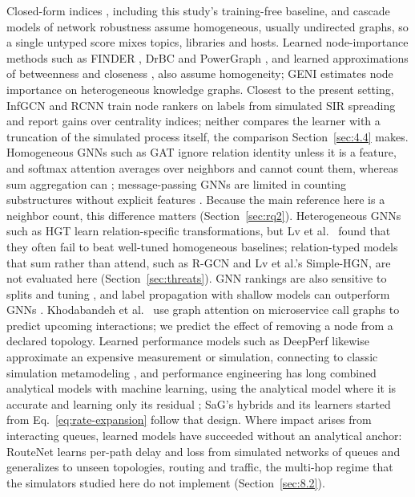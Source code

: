 \documentclass[preprint,3p]{elsarticle}
\begin{document}
Closed-form indices \cite{freeman1977centrality,brandes2001faster,brin1998pagerank,newman2010networks}, including this study's training-free baseline, and cascade models of network robustness \cite{albert2000error,motter2002cascade,buldyrev2010cascade} assume homogeneous, usually undirected graphs, so a single untyped score mixes topics, libraries and hosts. Learned node-importance methods such as FINDER \cite{fan2020keyplayers}, DrBC \cite{fan2019learning} and PowerGraph \cite{varbella2024powergraph}, and learned approximations of betweenness and closeness \cite{maurya2021gnnbet}, also assume homogeneity; GENI \cite{park2019geni} estimates node importance on heterogeneous knowledge graphs. Closest to the present setting, InfGCN \cite{zhao2020infgcn} and RCNN \cite{yu2020rcnn} train node rankers on labels from simulated SIR spreading and report gains over centrality indices; neither compares the learner with a truncation of the simulated process itself, the comparison Section~\ref{sec:4.4} makes. Homogeneous GNNs such as GAT \cite{velickovic2018graph} ignore relation identity unless it is a feature, and softmax attention averages over neighbors and cannot count them, whereas sum aggregation can \cite{xu2019gin,corso2020pna}; message-passing GNNs are limited in counting substructures without explicit features \cite{chen2020can}. Because the main reference here is a neighbor count, this difference matters (Section~\ref{sec:rq2}). Heterogeneous GNNs such as HGT \cite{hu2020hgt} learn relation-specific transformations, but Lv et al.~\cite{lv2021revisiting} found that they often fail to beat well-tuned homogeneous baselines; relation-typed models that sum rather than attend, such as R-GCN \cite{schlichtkrull2018rgcn} and Lv et al.'s Simple-HGN, are not evaluated here (Section~\ref{sec:threats}). GNN rankings are also sensitive to splits and tuning \cite{shchur2018pitfalls}, and label propagation with shallow models can outperform GNNs \cite{huang2021combining}. Khodabandeh et al.~\cite{khodabandeh2025linkpred} use graph attention on microservice call graphs to predict upcoming interactions; we predict the effect of removing a node from a declared topology. Learned performance models such as DeepPerf \cite{ha2019deepperf} likewise approximate an expensive measurement or simulation, connecting to classic simulation metamodeling \cite{kleijnen2015design}, and performance engineering has long combined analytical models with machine learning, using the analytical model where it is accurate and learning only its residual \cite{didona2015enhancing}; SaG's hybrids and its learners started from Eq.~\eqref{eq:rate-expansion} follow that design. Where impact arises from interacting queues, learned models have succeeded without an analytical anchor: RouteNet \cite{rusek2020routenet} learns per-path delay and loss from simulated networks of queues and generalizes to unseen topologies, routing and traffic, the multi-hop regime that the simulators studied here do not implement (Section~\ref{sec:8.2}).
\end{document}
